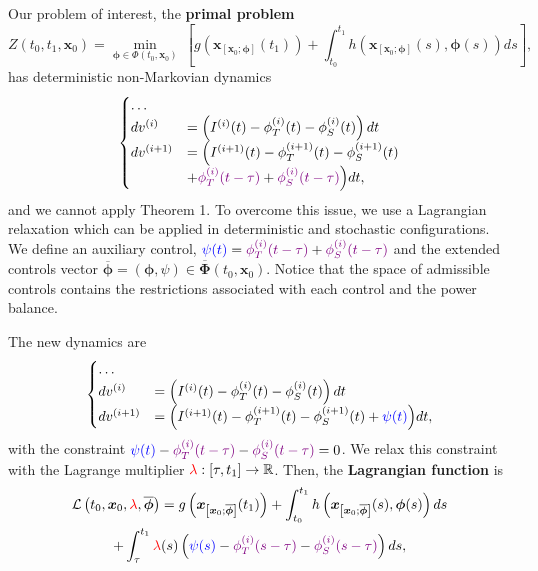 \documentclass[ima, 20pt, portrait, plainboxedsections]{sciposter}
\newcommand{\R}{\mathbb{R}}
\begin{document}
\begin{multicols}{3}
Our problem of interest, the \textbf{primal problem}
\begin{equation*}
Z(t_0,t_1,\bm{x}_0)=\min_{\bm{\phi}\in \Phi(t_0,\bm{x}_0)}\ \left[g(\bm{x}_{[\bm{x}_0;\bm{\phi}]}(t_1))+\int_{t_0}^{t_1}h(\bm{x}_{[\bm{x}_0;\bm{\phi}]}(s),\bm{\phi}(s))ds\right],
\end{equation*}
has deterministic non-Markovian dynamics
\begin{equation*}
\begin{cases}
\dots\\
dv^{(i)}&=\left(I^{(i)}(t)-\phi_T^{(i)}(t)-\phi_S^{(i)}(t)\right)dt\\
dv^{(i+1)}&=\Big(I^{(i+1)}(t)-\phi_T^{(i+1)}(t)-\phi_S^{(i+1)}(t)\\
&+{\color{violet}\phi_T^{(i)}(t-\tau)}+{\color{violet}\phi_S^{(i)}(t-\tau)}\Big)dt,
\end{cases}
\end{equation*}
and we cannot apply Theorem 1. To overcome this issue, we use a Lagrangian relaxation which can be applied in deterministic and stochastic configurations.\\
We define an auxiliary control, ${\color{blue}\psi(t)}={\color{violet}\phi_T^{(i)}(t-\tau)}+{\color{violet}\phi_S^{(i)}(t-\tau)}$ and the extended controls vector $\overline{\bm{\phi}}=(\bm{\phi},\psi)\in\overline{\bm{\Phi}}(t_0,\bm{x}_0)$. Notice that the space of admissible controls contains the restrictions associated with each control and the power balance.
 
The new dynamics are
\begin{equation*}
\begin{cases}
\dots\\
dv^{(i)}&=\left(I^{(i)}(t)-\phi_T^{(i)}(t)-\phi_S^{(i)}(t)\right)dt\\
dv^{(i+1)}&=\Big(I^{(i+1)}(t)-\phi_T^{(i+1)}(t)-\phi_S^{(i+1)}(t)+{\color{blue}\psi(t)}\Big)dt,
\end{cases}
\end{equation*}
with the constraint ${\color{blue}\psi(t)}-{\color{violet}\phi_T^{(i)}(t-\tau)}-{\color{violet}\phi_S^{(i)}(t-\tau)}=0$. We relax this constraint with the Lagrange multiplier ${\color{red}\lambda}:[\tau,t_1]\to\R$. Then, the \textbf{Lagrangian function} is
\begin{multline*}
\mathcal{L}\left(t_0,\bm{x}_0,{\color{red}\lambda},\overline{\bm{\phi}}\right)=g\left(\bm{x}_{\left[\bm{x}_0;\overline{\bm{\phi}}\right]}(t_1)\right)+\int_{t_0}^{t_1}h\left(\bm{x}_{\left[\bm{x}_0;\overline{\bm{\phi}}\right]}(s),\bm{\phi}(s)\right)ds\\
+\int_{\tau}^{t_1}{\color{red}\lambda}(s)\left({\color{blue}\psi(s)}-{\color{violet}\phi_T^{(i)}(s-\tau)}-{\color{violet}\phi_S^{(i)}(s-\tau)}\right)ds,
\end{multline*}


\end{multicols}
\end{document}
